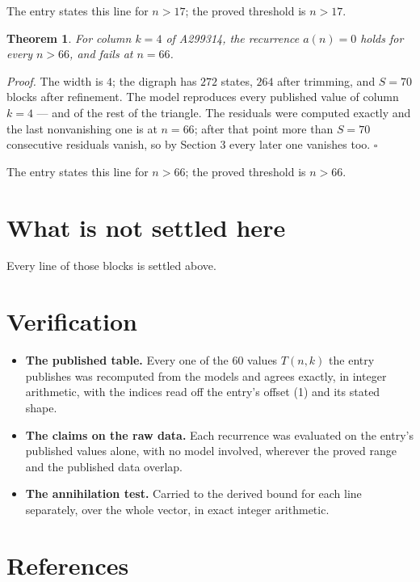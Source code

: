 \documentclass[11pt]{article}
\newtheorem{theorem}{Theorem}
\theoremstyle{definition}
\begin{document}
The entry states this line for $n > 17$; the proved threshold is $n > 17$.

\begin{theorem} For column $k = 4$ of A299314, the recurrence $a(n) = 0$ holds for every $n > 66$, and fails at $n = 66$.\end{theorem}

{\itshape Proof.} The width is $4$; the digraph has $272$ states, $264$ after trimming, and $S = 70$ blocks after refinement. The model reproduces every published value of column $k = 4$ --- and of the rest of the triangle. The residuals were computed exactly and the last nonvanishing one is at $n = 66$; after that point more than $S = 70$ consecutive residuals vanish, so by Section 3 every later one vanishes too. $\square$

The entry states this line for $n > 66$; the proved threshold is $n > 66$.

\section{What is not settled here}

Every line of those blocks is settled above.

\section{Verification}

\begin{itemize}

\item {\bfseries The published table.} Every one of the 60 values $T(n,k)$ the entry publishes was recomputed from the models and agrees exactly, in integer arithmetic, with the indices read off the entry's offset (1) and its stated shape.

\item {\bfseries The claims on the raw data.} Each recurrence was evaluated on the entry's published values alone, with no model involved, wherever the proved range and the published data overlap.

\item {\bfseries The annihilation test.} Carried to the derived bound for each line separately, over the whole vector, in exact integer arithmetic.

\end{itemize}

\section{References}
\end{document}
